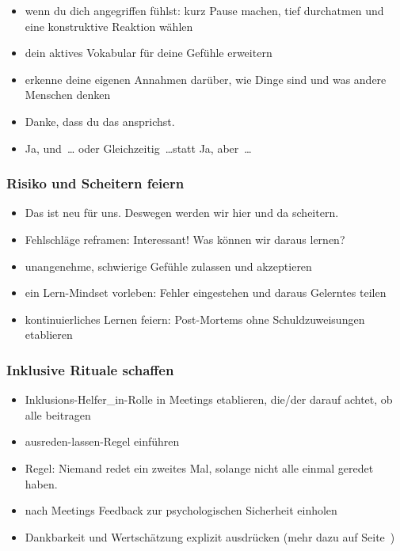 \begin{itemize}
  \item wenn du dich angegriffen fühlst: kurz Pause machen, tief durchatmen und eine konstruktive Reaktion wählen
  \item dein aktives Vokabular für deine Gefühle erweitern
  \item erkenne deine eigenen Annahmen darüber, wie Dinge sind und was andere Menschen denken 
  \item \glqq Danke, dass du das ansprichst.\grqq {}
  \item \glqq Ja, und~\ldots\grqq{} oder \glqq Gleichzeitig~\ldots\grqq statt \glqq Ja, aber~\ldots\grqq {}
\end{itemize}


\subsubsection{Risiko und Scheitern feiern}

\begin{itemize}
  \item \glqq Das ist neu für uns. Deswegen werden wir hier und da scheitern.\grqq
  \item Fehlschläge reframen: \glqq Interessant! Was können wir daraus lernen?\grqq {} 
  \item unangenehme, schwierige Gefühle zulassen und akzeptieren 
  \item ein Lern-Mindset vorleben: Fehler eingestehen und daraus Gelerntes teilen 
  \item kontinuierliches Lernen feiern: Post-Mortems ohne Schuldzuweisungen etablieren  
\end{itemize}


\subsubsection{Inklusive Rituale schaffen}

\begin{itemize}
  \item \glqq Inklusions-Helfer\_in\grqq-Rolle in Meetings etablieren, die/der darauf achtet, ob alle beitragen 
  \item \glqq ausreden-lassen\grqq-Regel einführen 
  \item Regel: \glqq Niemand redet ein zweites Mal, solange nicht alle einmal geredet haben.\grqq
  \item nach Meetings Feedback zur psychologischen Sicherheit einholen
  \item Dankbarkeit und Wertschätzung explizit ausdrücken (mehr dazu auf Seite~\pageref{wertschaetzung})  
\end{itemize}
